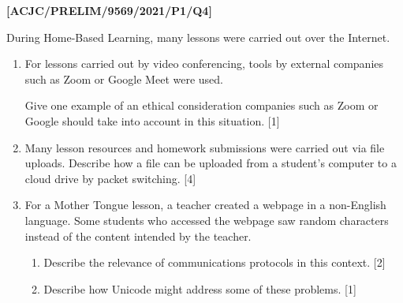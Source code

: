 \item \textbf{{[}ACJC/PRELIM/9569/2021/P1/Q4{]} }

During Home-Based Learning, many lessons were carried out over the
Internet.
\begin{enumerate}
\item For lessons carried out by video conferencing, tools by external companies
such as Zoom or Google Meet were used.

Give one example of an ethical consideration companies such as Zoom
or Google should take into account in this situation. \hfill{}{[}1{]}
\item Many lesson resources and homework submissions were carried out via
file uploads. Describe how a file can be uploaded from a student\textquoteright s
computer to a cloud drive by packet switching.\hfill{} {[}4{]}
\item For a Mother Tongue lesson, a teacher created a webpage in a non-English
language. Some students who accessed the webpage saw random characters
instead of the content intended by the teacher.
\begin{enumerate}
\item Describe the relevance of communications protocols in this context.
\hfill{}{[}2{]}
\item Describe how Unicode might address some of these problems.\hfill{}
{[}1{]}
\end{enumerate}
\end{enumerate}